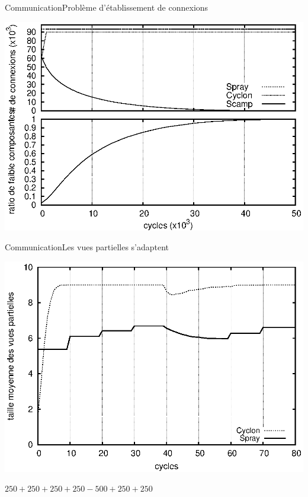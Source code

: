 \begin{frame}{Communication}{Problème d'établissement de connexions}

  \begin{center}
    \includegraphics[width=1\textwidth]{img/network/degen.eps}
  \end{center}

\end{frame}

\begin{frame}{Communication}{Les vues partielles s'adaptent}
  \begin{center}
    \includegraphics[width=1\textwidth]{img/network/avgpv.eps}
  \end{center}
  \begin{center}
    $250+250+250+250-500+250+250$
  \end{center}
\end{frame}


